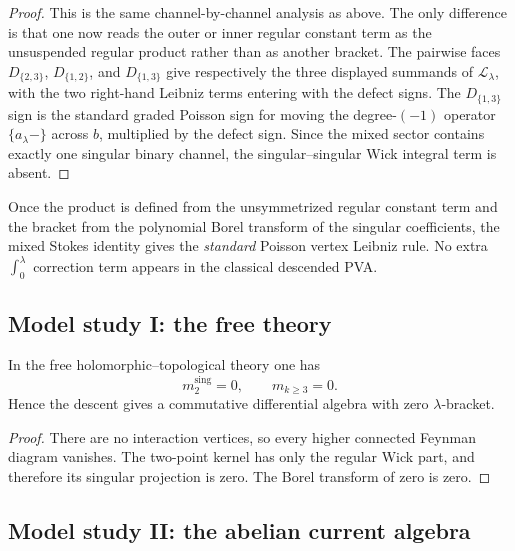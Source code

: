 \begin{proof}
This is the same channel-by-channel analysis as above. The only difference is that
one now reads the outer or inner regular constant term as the unsuspended
regular product rather than as another bracket.  The pairwise faces
$D_{\{2,3\}}$, $D_{\{1,2\}}$, and $D_{\{1,3\}}$ give respectively
the three displayed summands of \(\mathcal L_\lambda\), with the two
right-hand Leibniz terms entering with the defect signs.  The
$D_{\{1,3\}}$ sign is the standard graded Poisson sign for moving the
degree-$(-1)$ operator $\{a_\lambda-\}$ across $b$, multiplied by the
defect sign.  Since the mixed sector contains exactly one singular
binary channel, the singular--singular Wick integral term is absent.
\end{proof}

\begin{remark}
Once the product is defined from the unsymmetrized regular constant term and the bracket
from the polynomial Borel transform of the singular coefficients, the mixed Stokes
identity gives the \emph{standard} Poisson vertex Leibniz rule. No extra
$\int_0^\lambda$ correction term appears in the classical descended PVA.
\end{remark}

\subsection{Model study I: the free theory}

\begin{proposition}
\label{prop:free-study}
In the free holomorphic--topological theory one has
\[
m_2^{\mathrm{sing}}=0,\qquad m_{k\ge3}=0.
\]
Hence the descent gives a commutative differential algebra with zero
$\lambda$-bracket.
\end{proposition}

\begin{proof}
There are no interaction vertices, so every higher connected Feynman diagram vanishes.
The two-point kernel has only the regular Wick part, and therefore its singular
projection is zero. The Borel transform of zero is zero.
\end{proof}

\subsection{Model study II: the abelian current algebra}

